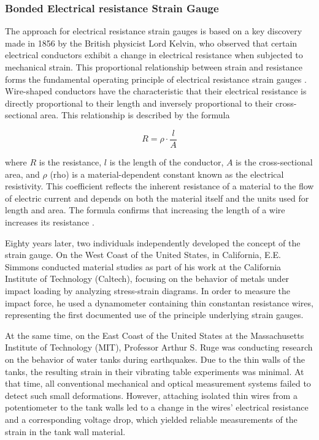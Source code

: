 \subsubsection{Bonded Electrical resistance Strain Gauge}

The approach for electrical resistance strain gauges is based on a key discovery made in 1856 by the British physicist Lord Kelvin, who observed that certain electrical conductors exhibit a change in electrical resistance when subjected to mechanical strain. This proportional relationship between strain and resistance forms the fundamental operating principle of electrical resistance strain gauges \cite[see][18]{Murray:1992}. 
Wire-shaped conductors have the characteristic that their electrical resistance is directly proportional to their length and inversely proportional to their cross-sectional area. This relationship is described by the formula 

$$R=\rho \cdot \frac{l}{A}$$

where $R$ is the resistance, $l$ is the length of the conductor, $A$ is the cross-sectional area, and $\rho$ (rho) is a material-dependent constant known as the electrical resistivity. This coefficient reflects the inherent resistance of a material to the flow of electric current and depends on both the material itself and the units used for length and area. The formula confirms that increasing the length of a wire increases its resistance \cite[see][231]{Riecke:1896}. 

Eighty years later, two individuals independently developed the concept of the strain gauge. On the West Coast of the United States, in California, E.E. Simmons conducted material studies as part of his work at the California Institute of Technology (Caltech), focusing on the behavior of metals under impact loading by analyzing stress-strain diagrams. In order to measure the impact force, he used a dynamometer containing thin constantan resistance wires, representing the first documented use of the principle underlying strain gauges.  

At the same time, on the East Coast of the United States at the Massachusetts Institute of Technology (MIT), Professor Arthur S. Ruge was conducting research on the behavior of water tanks during earthquakes. Due to the thin walls of the tanks, the resulting strain in their vibrating table experiments was minimal. At that time, all conventional mechanical and optical measurement systems failed to detect such small deformations. However, attaching isolated thin wires from a potentiometer to the tank walls led to a change in the wires’ electrical resistance and a corresponding voltage drop, which yielded reliable measurements of the strain in the tank wall material.

